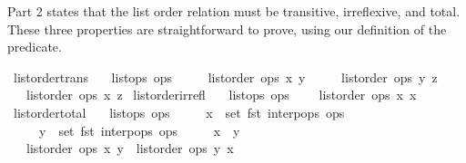 Part 2 states that the list order relation must be transitive, irreflexive, and total.
These three properties are straightforward to prove, using our definition of the  predicate.

\begin{isabelle}
\isamarkupfalse%
\ list{\isacharunderscore}order{\isacharunderscore}trans{\isacharcolon}\isanewline
\ \ \ {\isachardoublequoteopen}list{\isacharunderscore}ops\ ops{\isachardoublequoteclose}\isanewline
\ \ \ \ \ {\isachardoublequoteopen}list{\isacharunderscore}order\ ops\ x\ y{\isachardoublequoteclose}\isanewline
\ \ \ \ \ {\isachardoublequoteopen}list{\isacharunderscore}order\ ops\ y\ z{\isachardoublequoteclose}\isanewline
\ \ \ {\isachardoublequoteopen}list{\isacharunderscore}order\ ops\ x\ z{\isachardoublequoteclose}\isanewline
\isanewline
{}\isamarkupfalse%
\ list{\isacharunderscore}order{\isacharunderscore}irrefl{\isacharcolon}\isanewline
\ \ \ {\isachardoublequoteopen}list{\isacharunderscore}ops\ ops{\isachardoublequoteclose}\isanewline
\ \ \ {\isachardoublequoteopen}{\isasymnot}\ list{\isacharunderscore}order\ ops\ x\ x{\isachardoublequoteclose}\isanewline
\isanewline
{}\isamarkupfalse%
\ list{\isacharunderscore}order{\isacharunderscore}total{\isacharcolon}\isanewline
\ \ \ {\isachardoublequoteopen}list{\isacharunderscore}ops\ ops{\isachardoublequoteclose}\isanewline
\ \ \ \ \ {\isachardoublequoteopen}x\ {\isasymin}\ set\ {\isacharparenleft}fst\ {\isacharparenleft}interp{\isacharunderscore}ops\ ops{\isacharparenright}{\isacharparenright}{\isachardoublequoteclose}\isanewline
\ \ \ \ \ {\isachardoublequoteopen}y\ {\isasymin}\ set\ {\isacharparenleft}fst\ {\isacharparenleft}interp{\isacharunderscore}ops\ ops{\isacharparenright}{\isacharparenright}{\isachardoublequoteclose}\isanewline
\ \ \ \ \ {\isachardoublequoteopen}x\ {\isasymnoteq}\ y{\isachardoublequoteclose}\isanewline
\ \ \ {\isachardoublequoteopen}list{\isacharunderscore}order\ ops\ x\ y\ {\isasymor}\ list{\isacharunderscore}order\ ops\ y\ x{\isachardoublequoteclose}
\end{isabelle}
